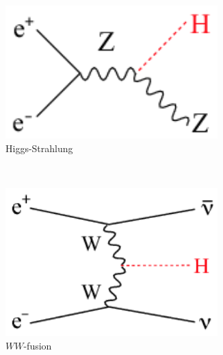     \begin{figure}  
        \centering
        \begin{subfigure}[t]{0.3\textwidth}
            \includegraphics[width = 0.9\textwidth]{Pictures/Higgs/Chapter_Theory_figs_ZHdiagram.png}
            \caption{Higgs-Strahlung}
            \label{fig:higgsStrahlung}
        \end{subfigure}
        ~%
        \begin{subfigure}[t]{0.3\textwidth}
            \includegraphics[width = 0.9\textwidth]{Pictures/Higgs/Chapter_Theory_figs_nunuHdiagram.png}
            \caption{$WW$-fusion}
            \label{fig:WW-fusion}
        \end{subfigure}
        ~%
        \begin{subfigure}[t]{0.3\textwidth}

\end{subfigure}
\end{figure}
